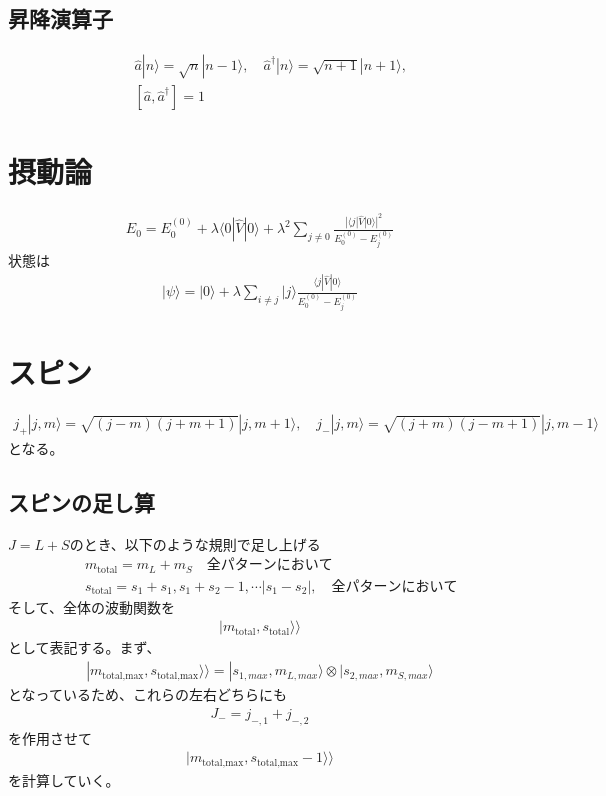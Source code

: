\documentclass[12pt,dvipdfmx]{jsarticle}
\begin{document}
\subsection*{昇降演算子}
\begin{eqnarray}
  &&\hat{a}|n\rangle = \sqrt{n}|n-1\rangle,\quad \hat{a}^{\dagger}|n\rangle = \sqrt{n+1}|n+1\rangle,\\
  &&\left[\hat{a},\hat{a}^{\dagger}\right]=1
\end{eqnarray}

\section*{\Large{摂動論}}
\begin{eqnarray}
  E_0 = E_0^{(0)}+ \lambda\langle 0|\hat{V}|0\rangle + \lambda^2 \sum_{j\neq 0}\frac{|\langle j|\hat{V}|0\rangle|^2}{E_0^{(0)}-E_j^{(0)}}
\end{eqnarray}
状態は
\begin{eqnarray}
  |\psi\rangle = |0\rangle + \lambda\sum_{i\neq j}|j\rangle \frac{\langle j|\hat{V}|0\rangle}{E_0^{(0)}-E_j^{(0)}}
\end{eqnarray}
\section*{\Large{スピン}}
\begin{eqnarray}
  j_+|j,m\rangle= \sqrt{ (j-m)(j+m+1) }|j,m+1\rangle,\quad j_-|j,m\rangle= \sqrt{ (j+m)(j-m+1) }|j,m-1\rangle
\end{eqnarray}
となる。
\subsection*{スピンの足し算}
$J = L+S$のとき、以下のような規則で足し上げる
\begin{eqnarray}
  &&m_{\text{total}}= m_L + m_S \quad 全パターンにおいて\\
  &&s_{\text{total}}= s_1+s_1,s_1+s_2-1,\cdots |s_1-s_2|,\quad 全パターンにおいて
\end{eqnarray}
そして、全体の波動関数を
\begin{eqnarray}
  |m_{\text{total}},s_{\text{total}}\rangle\rangle 
\end{eqnarray}
として表記する。まず、
\begin{eqnarray}
  |m_{\text{total,max}},s_{\text{total,max}}\rangle\rangle = |s_{1,max}, m_{L,max}\rangle\otimes |s_{2,max}, m_{S,max}\rangle
\end{eqnarray}
となっているため、これらの左右どちらにも
\begin{eqnarray}
  J_- = j_{-,1} + j_{-,2}
\end{eqnarray}
を作用させて
\begin{eqnarray}
  |m_{\text{total,max}},s_{\text{total,max}}-1\rangle\rangle
\end{eqnarray}
を計算していく。
\end{document}
